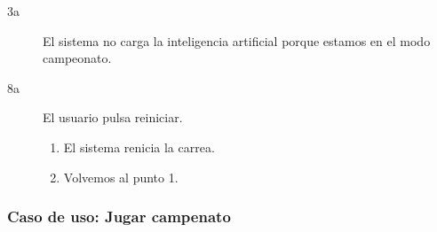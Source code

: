 \begin{description}
\begin{description}
            \item[3a ] El sistema no carga la inteligencia artificial porque estamos en el modo campeonato.
            
            \item[8a ] El usuario pulsa reiniciar.
                \begin{enumerate}
                    \item El sistema renicia la carrea.
                    \item Volvemos al punto 1.
                \end{enumerate}
        \end{description}
\end{description}

\subsubsection{Caso de uso: Jugar campenato}


